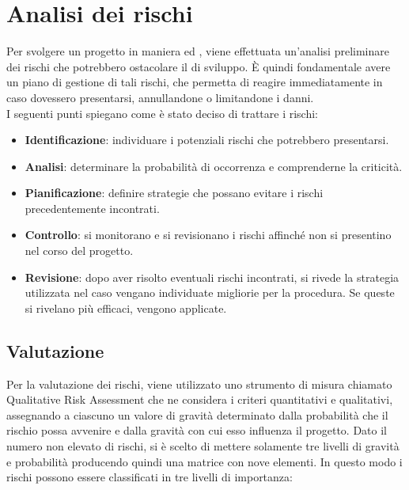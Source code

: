 
\newpage
\section{Analisi dei rischi} \label{AnalisiDeiRischi}
	Per svolgere un progetto in maniera  ed , viene effettuata un'analisi preliminare dei rischi che potrebbero ostacolare il  di sviluppo.
	È quindi fondamentale avere un piano di gestione di tali rischi, che permetta di reagire immediatamente in caso dovessero presentarsi, annullandone o limitandone i danni.\\
	I seguenti punti spiegano come è stato deciso di trattare i rischi:
	\begin{itemize}
		\item \textbf{Identificazione}: individuare i potenziali rischi che potrebbero presentarsi.
		\item \textbf{Analisi}: determinare la probabilità di occorrenza e comprenderne la criticità.
		\item \textbf{Pianificazione}: definire strategie che possano evitare i rischi precedentemente incontrati.
		\item \textbf{Controllo}: si monitorano e si revisionano i rischi affinché non si presentino nel corso del progetto.
		\item \textbf{Revisione}: dopo aver risolto eventuali rischi incontrati, si rivede la strategia utilizzata nel caso vengano individuate migliorie per la procedura. Se queste si rivelano più efficaci, vengono applicate.
	\end{itemize}

	\subsection{Valutazione}
	Per la valutazione dei rischi, viene utilizzato uno strumento di misura chiamato Qualitative Risk Assessment che ne considera i criteri quantitativi e qualitativi,
	assegnando a ciascuno un valore di gravità determinato dalla probabilità che il rischio possa avvenire e dalla gravità con cui esso influenza il progetto.
	Dato il numero non elevato di rischi, si è scelto di mettere solamente tre livelli di gravità e probabilità producendo quindi una matrice con nove elementi. In
	questo modo i rischi possono essere classificati in tre livelli di importanza:

